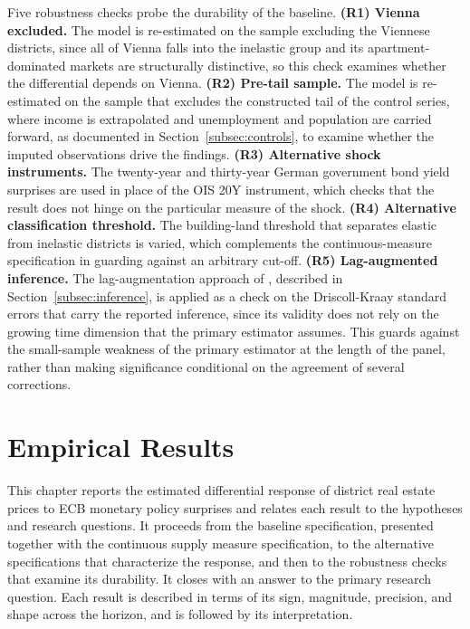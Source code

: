\documentclass[a4paper,12pt, headsepline]{scrartcl}
\numberwithin{equation}{section}
\begin{document}
Five robustness checks probe the durability of the baseline. \textbf{(R1) Vienna excluded.} The model is re-estimated on the sample excluding the Viennese districts, since all of Vienna falls into the inelastic group and its apartment-dominated markets are structurally distinctive, so this check examines whether the differential depends on Vienna. \textbf{(R2) Pre-tail sample.} The model is re-estimated on the sample that excludes the constructed tail of the control series, where income is extrapolated and unemployment and population are carried forward, as documented in Section~\ref{subsec:controls}, to examine whether the imputed observations drive the findings. \textbf{(R3) Alternative shock instruments.} The twenty-year and thirty-year German government bond yield surprises are used in place of the OIS 20Y instrument, which checks that the result does not hinge on the particular measure of the shock. \textbf{(R4) Alternative classification threshold.} The building-land threshold that separates elastic from inelastic districts is varied, which complements the continuous-measure specification in guarding against an arbitrary cut-off. \textbf{(R5) Lag-augmented inference.} The lag-augmentation approach of \citet{montielolea2021}, described in Section~\ref{subsec:inference}, is applied as a check on the Driscoll-Kraay standard errors that carry the reported inference, since its validity does not rely on the growing time dimension that the primary estimator assumes. This guards against the small-sample weakness of the primary estimator at the length of the panel, rather than making significance conditional on the agreement of several corrections.

\section{Empirical Results}\label{sec:results}

This chapter reports the estimated differential response of district real estate prices to ECB monetary policy surprises and relates each result to the hypotheses and research questions. It proceeds from the baseline specification, presented together with the continuous supply measure specification, to the alternative specifications that characterize the response, and then to the robustness checks that examine its durability. It closes with an answer to the primary research question. Each result is described in terms of its sign, magnitude, precision, and shape across the horizon, and is followed by its interpretation.
\end{document}
